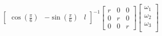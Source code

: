 \documentclass{article}
\begin{document}
\begin{align*}
\begin{bmatrix}
	        	\cos(\frac{\pi}{6}) & -\sin(\frac{\pi}{6}) & l
	        \end{bmatrix}^{-1}
	        \begin{bmatrix}
	            r & 0 & 0 \\
	            0 & r & 0 \\
	            0 & 0 & r
	        \end{bmatrix}
		    \begin{bmatrix}
		       \omega_{1} \\
		       \omega_{2} \\
		       \omega_{3} \\
		    \end{bmatrix} \\
\end{align*}
\end{document}
